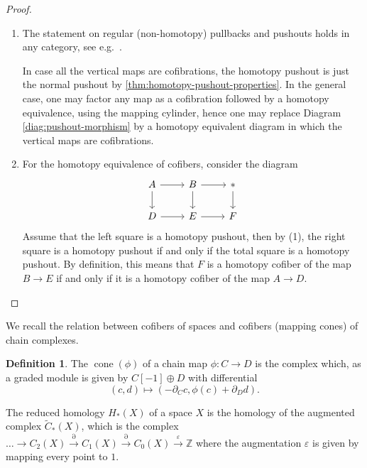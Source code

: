 \documentclass{scrartcl}
\let\emph\relax
\theoremstyle{plain}
\theoremstyle{definition}
\newtheorem{definition}[theorem]{Definition}
\newcommand{\Z}{\mathbb Z}
\renewcommand{\epsilon}{\varepsilon}
\DeclareMathOperator{\cone}{cone}
\let\xto\xrightarrow
\begin{document}
\begin{proof}
    \begin{enumerate}
        \item The statement on regular (non-homotopy) pullbacks and pushouts holds in any category, see e.g.\ \cite[p. 72, ex. 8]{mac2013categories}.
            
            In case all the vertical maps are cofibrations, the homotopy pushout is just the normal pushout by \cref{thm:homotopy-pushout-properties}. In the general case, one may factor any map as a cofibration followed by a homotopy equivalence, using the mapping cylinder, hence one may replace Diagram \ref{diag:pushout-morphism} by a homotopy equivalent diagram in which the vertical maps are cofibrations. 
        \item For the homotopy equivalence of cofibers, consider the diagram
        \begin{equation}
            \begin{tikzcd}
                A \dar\rar & B \dar\rar &\dar * \\
                D \rar & E \rar & F
            \end{tikzcd}
        \end{equation}
        Assume that the left square is a homotopy pushout, then by (1), the right square is a homotopy pushout if and only if the total square is a homotopy pushout. By definition, this means that $F$ is a homotopy cofiber of the map $B\to E$ if and only if it is a homotopy cofiber of the map $A\to D$. 
    \end{enumerate}
\end{proof}

We recall the relation between cofibers of spaces and cofibers (mapping cones) of chain complexes. 
\begin{definition}
The \emph{mapping cone} $\cone(\phi)$ of a chain map $\phi\colon C\to D$ is the complex which, as a graded module is given by $C[-1]\oplus D$ with differential $$(c, d)\mapsto (-\partial_C c, \phi(c) + \partial_D d).$$ 
\end{definition}
The reduced homology $H_*(X)$ of a space $X$ is the homology of the augmented complex $\tilde C_*(X)$, which is the complex $\dots\to C_2(X)\xto{\partial} C_1(X)\xto{\partial} C_0(X)\xto{\epsilon} \Z$ where the augmentation $\epsilon$ is given by mapping every point to $1$. 
\end{document}
